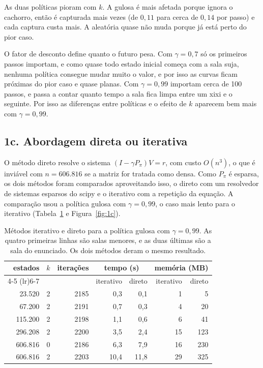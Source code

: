 \documentclass[11pt,a4paper]{article}
\begin{document}
As duas políticas pioram com $k$. A gulosa é mais afetada porque ignora o cachorro, então é capturada mais vezes (de $0{,}11$ para cerca de $0{,}14$ por passo) e cada captura custa mais. A aleatória quase não muda porque já está perto do pior caso.

O fator de desconto define quanto o futuro pesa. Com $\gamma = 0{,}7$ só os primeiros passos importam, e como quase todo estado inicial começa com a sala suja, nenhuma política consegue mudar muito o valor, e por isso as curvas ficam próximas do pior caso e quase planas. Com $\gamma = 0{,}99$ importam cerca de 100 passos, e passa a contar quanto tempo a sala fica limpa entre um xixi e o seguinte. Por isso as diferenças entre políticas e o efeito de $k$ aparecem bem mais com $\gamma = 0{,}99$.

\subsection*{1c. Abordagem direta ou iterativa}

O método direto resolve o sistema $(I - \gamma P_\pi) V = r$, com custo $O(n^3)$, o que é inviável com $n = 606.816$ se a matriz for tratada como densa. Como $P_\pi$ é esparsa, os dois métodos foram comparados aproveitando isso, o direto com um resolvedor de sistemas esparsos do scipy e o iterativo com a repetição da equação. A comparação usou a política gulosa com $\gamma = 0{,}99$, o caso mais lento para o iterativo (Tabela~\ref{tab:1c} e Figura~\ref{fig:1c}).

\begin{table}[H]
\centering
\small
\begin{tabular}{rrrrrrr}
\toprule
estados & $k$ & iterações & \multicolumn{2}{c}{tempo (s)} & \multicolumn{2}{c}{memória (MB)} \\
\cmidrule(lr){4-5} \cmidrule(lr){6-7}
 & & & iterativo & direto & iterativo & direto \\
\midrule
23.520  & 2 & 2185 & 0,3  & 0,1  & 1  & 5   \\
67.200  & 2 & 2191 & 0,7  & 0,3  & 4  & 20  \\
115.200 & 2 & 2198 & 1,1  & 0,6  & 6  & 41  \\
296.208 & 2 & 2200 & 3,5  & 2,4  & 15 & 123 \\
\midrule
606.816 & 0 & 2186 & 6,3  & 7,9  & 16 & 230 \\
606.816 & 2 & 2203 & 10,4 & 11,8 & 29 & 325 \\
\bottomrule
\end{tabular}
\caption{Métodos iterativo e direto para a política gulosa com $\gamma = 0{,}99$. As quatro primeiras linhas são salas menores, e as duas últimas são a sala do enunciado. Os dois métodos deram o mesmo resultado.}
\label{tab:1c}
\end{table}
\end{document}
